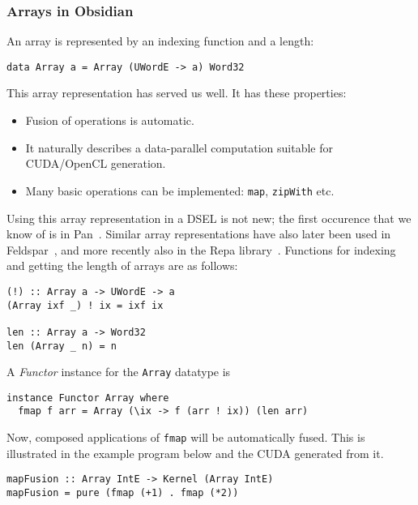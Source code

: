 \subsubsection{Arrays in Obsidian}

An array is represented by an indexing function and a length:
\begin{codesize} 
\begin{verbatim}
data Array a = Array (UWordE -> a) Word32 
\end{verbatim}
\end{codesize}
This array representation has served us well. It has these properties:
\begin{itemize} 
\item Fusion of operations is automatic.
\item It naturally describes a data-parallel computation suitable for CUDA/OpenCL generation.
\item Many basic operations can be implemented: {\tt map}, {\tt zipWith} etc.
\end{itemize}
Using this array representation in a DSEL is not new; the first occurence that we know of is in
Pan~\cite{PAN}. Similar array representations have also later been 
used in Feldspar~\cite{FELDSPAR}, and more recently also in the Repa library~\cite{REPA}.
Functions for indexing and getting the length of arrays are as follows:
\begin{codesize} 
\begin{verbatim}
(!) :: Array a -> UWordE -> a 
(Array ixf _) ! ix = ixf ix 

len :: Array a -> Word32
len (Array _ n) = n 
\end{verbatim}
\end{codesize}
A {\em Functor} instance for the {\tt Array} datatype is
\begin{codesize} 
\begin{verbatim}
instance Functor Array where 
  fmap f arr = Array (\ix -> f (arr ! ix)) (len arr) 
\end{verbatim}
\end{codesize}
Now, composed applications of {\tt fmap} will be automatically fused. This is 
illustrated in the example program below and the CUDA generated
from it.  
\begin{codesize} 
\begin{verbatim}
mapFusion :: Array IntE -> Kernel (Array IntE) 
mapFusion = pure (fmap (+1) . fmap (*2)) 
\end{verbatim}
\end{codesize}

